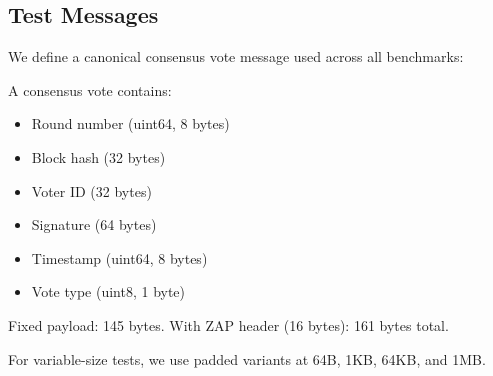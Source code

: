 \subsection{Test Messages}

We define a canonical consensus vote message used across all benchmarks:

\begin{definition}
\label{def:vote}
A consensus vote contains:
\begin{itemize}
\item Round number (uint64, 8 bytes)
\item Block hash (32 bytes)
\item Voter ID (32 bytes)
\item Signature (64 bytes)
\item Timestamp (uint64, 8 bytes)
\item Vote type (uint8, 1 byte)
\end{itemize}
Fixed payload: 145 bytes. With ZAP header (16 bytes): 161 bytes total.
\end{definition}

For variable-size tests, we use padded variants at 64B, 1KB, 64KB, and 1MB.

